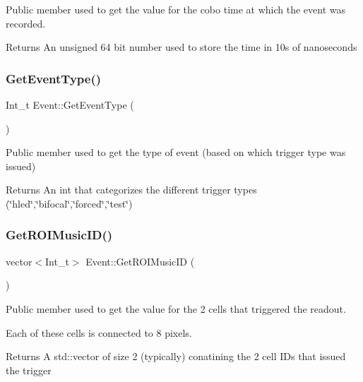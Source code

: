 Public member used to get the value for the cobo time at which the event was recorded. 

\begin{DoxyReturn}{Returns}
An unsigned 64 bit number used to store the time in 10s of nanoseconds 
\end{DoxyReturn}
\mbox{\label{classEvent_a3f345178041566aa9be891c5ed73529b}} 
\subsubsection{\texorpdfstring{Get\+Event\+Type()}{GetEventType()}}
{\footnotesize\ttfamily Int\+\_\+t Event\+::\+Get\+Event\+Type (\begin{DoxyParamCaption}{ }\end{DoxyParamCaption})}



Public member used to get the type of event (based on which trigger type was issued) 

\begin{DoxyReturn}{Returns}
An int that categorizes the different trigger types (\char`\"{}hled\char`\"{},\char`\"{}bifocal\char`\"{},\char`\"{}forced\char`\"{},\char`\"{}test\char`\"{}) 
\end{DoxyReturn}
\mbox{\label{classEvent_ac1cd2aa5cf840e254b4e680394040a06}} 
\subsubsection{\texorpdfstring{Get\+R\+O\+I\+Music\+I\+D()}{GetROIMusicID()}}
{\footnotesize\ttfamily vector$<$Int\+\_\+t$>$ Event\+::\+Get\+R\+O\+I\+Music\+ID (\begin{DoxyParamCaption}{ }\end{DoxyParamCaption})}



Public member used to get the value for the 2 cells that triggered the readout. 

Each of these cells is connected to 8 pixels. \begin{DoxyReturn}{Returns}
A std\+::vector of size 2 (typically) conatining the 2 cell I\+Ds that issued the trigger 
\end{DoxyReturn}
\mbox{\label{classEvent_a940ee7417960962d77566282ce761115}} 
